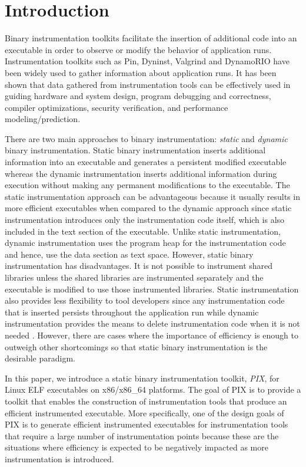 \section{Introduction}
\label{sec:Introduction}

Binary instrumentation toolkits facilitate the insertion of additional code into an
executable in order to observe or modify the behavior of application runs. 
Instrumentation toolkits such as Pin\cite{luk2005pin}, Dyninst\cite{buck2000api}, 
Valgrind\cite{nethercote2007valgrind} and DynamoRIO\cite{bruening2004efficient} have been widely used to gather information about
application runs. It has been shown that data gathered 
from instrumentation tools can be effectively used in guiding hardware and
system design, program debugging and correctness, compiler optimizations, security verification,
and performance modeling/prediction\cite{snavely2001modeling}.

There are two main approaches to binary instrumentation: \textit{static} 
and \textit{dynamic} binary instrumentation. Static binary
instrumentation inserts additional information into an executable and generates a persistent
modified executable whereas the dynamic instrumentation inserts additional information 
during execution without making any permanent modifications to the executable.
The static instrumentation approach can be advantageous because it usually results in more
efficient executables when compared to the dynamic approach
since static instrumentation introduces only the instrumentation code itself, 
which is also included in the text section of the executable. 
Unlike static instrumentation, dynamic
instrumentation uses the program heap for the instrumentation code and hence, use the data section as text space.
However, static binary instrumentation has disadvantages. It is not possible to instrument shared libraries 
unless the shared libraries are instrumented separately and the executable is modified to use those instrumented libraries. 
Static instrumentation also provides less flexibility to tool developers since any instrumentation code that is
inserted persists throughout the application run while dynamic instrumentation 
provides the means to delete instrumentation code when it is not needed \cite{tikir2002efficient}.
However, there are cases where the importance of efficiency is enough to outweigh
other shortcomings \cite{carrington2006performance} so that static binary instrumentation is the
desirable paradigm. 

In this paper, we introduce a static binary instrumentation toolkit, \textit{PIX}, for Linux ELF executables on
x86/x86\_64 platforms. The goal of PIX is to provide a toolkit that enables the construction of
instrumentation tools that produce an efficient instrumented
executable. More specifically, one of the design goals of PIX is to generate efficient instrumented executables
for instrumentation tools that require a large number of instrumentation points because these are the situations 
where efficiency is expected to be negatively impacted as more instrumentation is introduced. 

